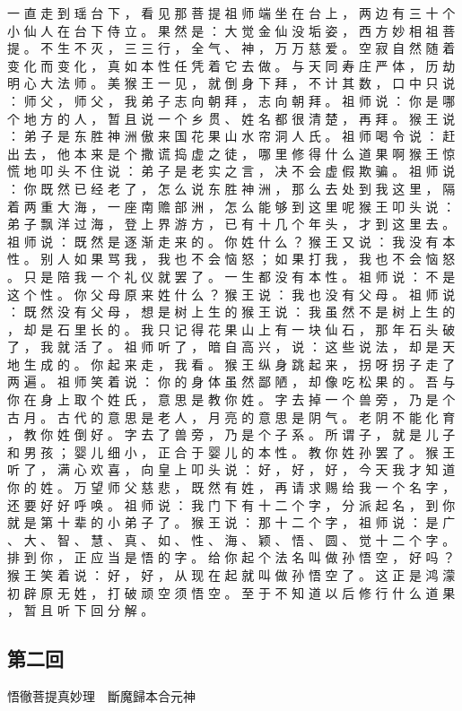 {一 直 走 到 瑶 台 下 ， 看 见 那 菩 提 祖 师 端 坐 在 台 上 ， 两 边 有 三 十 个 小 仙 人 在 台 下 侍 立 。
果 然 是 ： 大 觉 金 仙 没 垢 姿 ， 西 方 妙 相 祖 菩 提 。
不 生 不 灭 ， 三 三 行 ， 全 气 、 神 ， 万 万 慈 爱 。
空 寂 自 然 随 着 变 化 而 变 化 ， 真 如 本 性 任 凭 着 它 去 做 。
与 天 同 寿 庄 严 体 ， 历 劫 明 心 大 法 师 。
美 猴 王 一 见 ， 就 倒 身 下 拜 ， 不 计 其 数 ， 口 中 只 说 ： 师 父 ， 师 父 ， 我 弟 子 志 向 朝 拜 ， 志 向 朝 拜 。
祖 师 说 ： 你 是 哪 个 地 方 的 人 ， 暂 且 说 一 个 乡 贯 、 姓 名 都 很 清 楚 ， 再 拜 。
猴 王 说 ： 弟 子 是 东 胜 神 洲 傲 来 国 花 果 山 水 帘 洞 人 氏 。
祖 师 喝 令 说 ： 赶 出 去 ， 他 本 来 是 个 撒 谎 捣 虚 之 徒 ， 哪 里 修 得 什 么 道 果 啊 猴 王 惊 慌 地 叩 头 不 住 说 ： 弟 子 是 老 实 之 言 ， 决 不 会 虚 假 欺 骗 。
祖 师 说 ： 你 既 然 已 经 老 了 ， 怎 么 说 东 胜 神 洲 ， 那 么 去 处 到 我 这 里 ， 隔 着 两 重 大 海 ， 一 座 南 赡 部 洲 ， 怎 么 能 够 到 这 里 呢 猴 王 叩 头 说 ： 弟 子 飘 洋 过 海 ， 登 上 界 游 方 ， 已 有 十 几 个 年 头 ， 才 到 这 里 去 。
祖 师 说 ： 既 然 是 逐 渐 走 来 的 。
你 姓 什 么 ？ 猴 王 又 说 ： 我 没 有 本 性 。
别 人 如 果 骂 我 ， 我 也 不 会 恼 怒 ； 如 果 打 我 ， 我 也 不 会 恼 怒 。
只 是 陪 我 一 个 礼 仪 就 罢 了 。
一 生 都 没 有 本 性 。
祖 师 说 ： 不 是 这 个 性 。
你 父 母 原 来 姓 什 么 ？ 猴 王 说 ： 我 也 没 有 父 母 。
祖 师 说 ： 既 然 没 有 父 母 ， 想 是 树 上 生 的 猴 王 说 ： 我 虽 然 不 是 树 上 生 的 ， 却 是 石 里 长 的 。
我 只 记 得 花 果 山 上 有 一 块 仙 石 ， 那 年 石 头 破 了 ， 我 就 活 了 。
祖 师 听 了 ， 暗 自 高 兴 ， 说 ： 这 些 说 法 ， 却 是 天 地 生 成 的 。
你 起 来 走 ， 我 看 。
猴 王 纵 身 跳 起 来 ， 拐 呀 拐 子 走 了 两 遍 。
祖 师 笑 着 说 ： 你 的 身 体 虽 然 鄙 陋 ， 却 像 吃 松 果 的 。
吾 与 你 在 身 上 取 个 姓 氏 ， 意 思 是 教 你 姓 。
字 去 掉 一 个 兽 旁 ， 乃 是 个 古 月 。
古 代 的 意 思 是 老 人 ， 月 亮 的 意 思 是 阴 气 。
老 阴 不 能 化 育 ， 教 你 姓 倒 好 。
字 去 了 兽 旁 ， 乃 是 个 子 系 。
所 谓 子 ， 就 是 儿 子 和 男 孩 ；
婴 儿 细 小 ， 正 合 于 婴 儿 的 本 性 。
教 你 姓 孙 罢 了 。
猴 王 听 了 ， 满 心 欢 喜 ， 向 皇 上 叩 头 说 ： 好 ， 好 ， 好 ， 今 天 我 才 知 道 你 的 姓 。
万 望 师 父 慈 悲 ， 既 然 有 姓 ， 再 请 求 赐 给 我 一 个 名 字 ， 还 要 好 好 呼 唤 。
祖 师 说 ： 我 门 下 有 十 二 个 字 ， 分 派 起 名 ， 到 你 就 是 第 十 辈 的 小 弟 子 了 。
猴 王 说 ： 那 十 二 个 字 ， 祖 师 说 ： 是 广 、 大 、 智 、 慧 、 真 、 如 、 性 、 海 、 颖 、 悟 、 圆 、 觉 十 二 个 字 。
排 到 你 ， 正 应 当 是 悟 的 字 。
给 你 起 个 法 名 叫 做 孙 悟 空 ， 好 吗 ？ 猴 王 笑 着 说 ： 好 ， 好 ， 从 现 在 起 就 叫 做 孙 悟 空 了 。
这 正 是 鸿 濛 初 辟 原 无 姓 ， 打 破 顽 空 须 悟 空 。
至 于 不 知 道 以 后 修 行 什 么 道 果 ， 暂 且 听 下 回 分 解 。
}\switchcolumn\flushpage  \begin{pinyinscope}{\myfontt \section{第二回}     悟徹菩提真妙理　斷魔歸本合元神

}
\end{pinyinscope}
